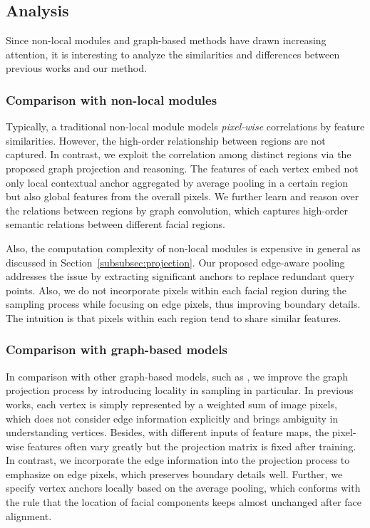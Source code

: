 \documentclass[runningheads]{llncs}
\begin{document}
\subsection{Analysis} \label{sec3.3}
Since non-local modules and graph-based methods have drawn increasing attention, it is interesting to analyze the similarities and differences between previous works and our method. 

\subsubsection{Comparison with non-local modules}
Typically, a traditional non-local module models {\it pixel-wise} correlations by feature similarities.  
However, the high-order relationship between regions are not captured. 
In contrast, we exploit the correlation among distinct regions via the proposed graph projection and reasoning. 
The features of each vertex embed not only local contextual anchor aggregated by average pooling in a certain region but also global features from the overall pixels. 
We further learn and reason over the relations between regions by graph convolution, which captures high-order semantic relations between different facial regions.  

Also, the computation complexity of non-local modules is expensive in general as discussed in Section~\ref{subsubsec:projection}.  
Our proposed edge-aware pooling addresses the issue by extracting significant anchors to replace redundant query points. 
Also, we do not incorporate pixels within each facial region during the sampling process while focusing on edge pixels, thus improving boundary details. 
The intuition is that pixels within each region tend to share similar features. 




\subsubsection{Comparison with graph-based models}
In comparison with other graph-based models, such as \cite{chen2019graph,li2018beyond}, we improve the graph projection process by introducing locality in sampling in particular. 
In previous works, each vertex is simply represented by a weighted sum of image pixels, which does not consider edge information explicitly and brings ambiguity in understanding vertices. 
Besides, with different inputs of feature maps, the pixel-wise features often vary greatly but the projection matrix is fixed after training. 
In contrast, we incorporate the edge information into the projection process to emphasize on edge pixels, which preserves boundary details well. 
Further, we specify vertex anchors locally based on the average pooling, which conforms with the rule that the location of facial components keeps almost unchanged after face alignment. 
\end{document}
